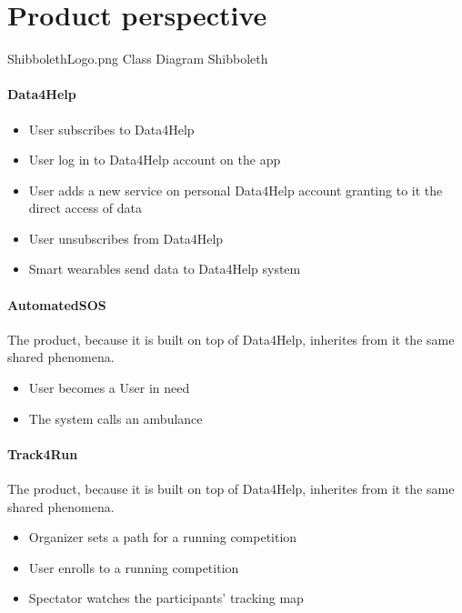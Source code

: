 \documentclass[../../rasd.tex]{subfiles}
\begin{document}
	
	\section{Product perspective}
		\image {5cm} {ShibbolethLogo.png} {Class Diagram} {Shibboleth}
		\paragraph{Data4Help}
		\begin{itemize}
			\item User subscribes to Data4Help
			\item User log in to Data4Help account on the app
			\item User adds a new service on personal Data4Help account granting to it the direct access of data
			\item User unsubscribes from Data4Help
			\item Smart wearables send data to Data4Help system
		\end{itemize}
		\paragraph{AutomatedSOS}
		The product, because it is built on top of Data4Help, inherites from it the same shared phenomena.
		\begin{itemize}
			\item User becomes a User in need
			\item The system calls an ambulance
		\end{itemize}
		\paragraph{Track4Run}
		The product, because it is built on top of Data4Help, inherites from it the same shared phenomena.
		\begin{itemize}
			\item Organizer sets a path for a running competition
			\item User enrolls to a running competition
			\item Spectator watches the participants' tracking map			
		\end{itemize}
\end{document}
